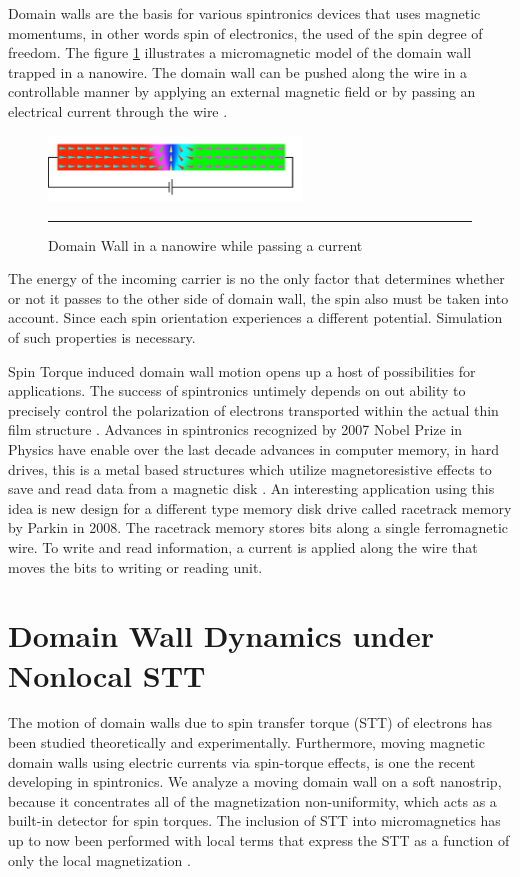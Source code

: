 Domain walls are the basis for various spintronics devices that uses magnetic momentums, in other words spin of electronics, the used of the spin degree of freedom. The figure \ref{fig:DWspin} illustrates a micromagnetic model of the domain wall trapped in a nanowire. The domain wall can be pushed along the wire in a controllable manner by applying an external magnetic field or by passing an electrical current through the wire \cite{dwwire}.

\begin{figure}[htbp]
	\centering
		\includegraphics[width=0.6\textwidth]{Figures/DWspin.png}
		\rule{35em}{0.52pt}
	\caption[Domain Wall nanowire]{Domain Wall in a nanowire while passing a current}
	\label{fig:DWspin}
\end{figure}

The energy of the incoming  carrier is no the only factor that determines whether or not it passes to the other side of domain wall, the spin also must be taken into account. Since each spin orientation experiences a different potential. Simulation of such properties is necessary.

Spin Torque induced domain wall motion opens up a host of possibilities for applications. The success of spintronics untimely depends on out ability to precisely  control the polarization of electrons transported within the actual thin film structure \cite{ferro}. Advances in spintronics recognized by 2007 Nobel Prize in Physics have enable over the last decade advances in computer memory, in hard drives, this is a metal based structures which utilize magnetoresistive effects to save and read data from a magnetic disk \cite{handbookspin}. An interesting application using this idea is new design for a different type memory disk drive called racetrack memory by Parkin in 2008\cite{racetrack}. The racetrack memory stores bits along a single ferromagnetic wire. To write and read information, a current is applied along the wire that moves the bits to writing or reading unit.
 
\section{Domain Wall Dynamics under Nonlocal STT}

The motion of domain walls due to spin transfer torque (STT) of electrons has been studied theoretically and experimentally. Furthermore, moving magnetic domain walls using electric currents via spin-torque effects, is one the recent developing in spintronics. We analyze a moving domain wall on a soft nanostrip, because it concentrates all of the magnetization non-uniformity, which acts as a built-in detector for spin torques. The inclusion of STT into micromagnetics has up to now been performed with local terms that express the STT as a function of only the local magnetization \cite{claudio}.
 
